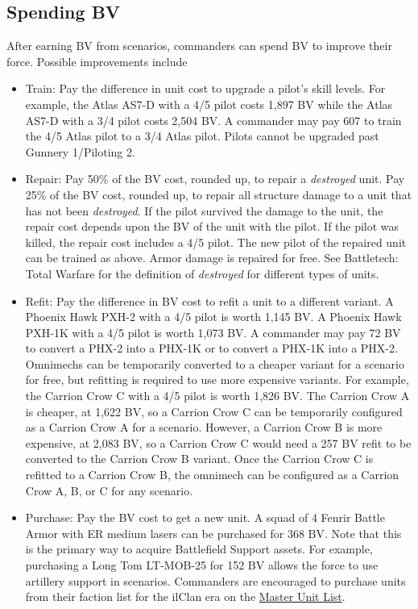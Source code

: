 \documentclass[UTF8]{article}
\begin{document}
\newpage

\subsection{Spending BV}

After earning BV from scenarios, commanders can spend BV to improve their force.
Possible improvements include

\begin{itemize}

\item Train: Pay the difference in unit cost to upgrade a pilot's skill levels.
For example, the Atlas AS7-D with a 4/5 pilot costs 1,897 BV while the Atlas AS7-D with a 3/4 pilot costs 2,504 BV.
A commander may pay 607 to train the 4/5 Atlas pilot to a 3/4 Atlas pilot.
Pilots cannot be upgraded past Gunnery 1/Piloting 2.

\item Repair: Pay 50\% of the BV cost, rounded up, to repair a \emph{destroyed} unit.
Pay 25\% of the BV cost, rounded up, to repair all structure damage to a unit that has not been \emph{destroyed}.
If the pilot survived the damage to the unit, the repair cost depends upon the BV of the unit with the pilot.
If the pilot was killed, the repair cost includes a 4/5 pilot.
The new pilot of the repaired unit can be trained as above.
Armor damage is repaired for free.
See Battletech: Total Warfare for the definition of \emph{destroyed} for different types of units.

\item Refit: Pay the difference in BV cost to refit a unit to a different variant.
A Phoenix Hawk PXH-2 with a 4/5 pilot is worth 1,145 BV.
A Phoenix Hawk PXH-1K with a 4/5 pilot is worth 1,073 BV.
A commander may pay 72 BV to convert a PHX-2 into a PHX-1K or to convert a PHX-1K into a PHX-2.
Omnimechs can be temporarily converted to a cheaper variant for a scenario for free, but refitting is required to use more expensive variants.
For example, the Carrion Crow C with a 4/5 pilot is worth 1,826 BV.
The Carrion Crow A is cheaper, at 1,622 BV, so a Carrion Crow C can be temporarily configured as a Carrion Crow A for a scenario.
However, a Carrion Crow B is more expensive, at 2,083 BV, so a Carrion Crow C would need a 257 BV refit to be converted to the Carrion Crow B variant.
Once the Carrion Crow C is refitted to a Carrion Crow B, the omnimech can be configured as a Carrion Crow A, B, or C for any scenario.

\item Purchase: Pay the BV cost to get a new unit.
A squad of 4 Fenrir Battle Armor with ER medium lasers can be purchased for 368 BV.
Note that this is the primary way to acquire Battlefield Support assets.
For example, purchasing a Long Tom LT-MOB-25 for 152 BV allows the force to use artillery support in scenarios.
Commanders are encouraged to purchase units from their faction list for the ilClan era on the \href{http://www.masterunitlist.info/}{Master Unit List}.


\end{itemize}
\end{document}
